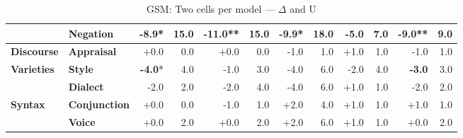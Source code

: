 \begin{table}[h]
{\begin{tabular}{llrrrrrrrrrr}
  & \textbf{Negation} & \cellcolor{red!17} \textbf{-8.9}* & \cellcolor{blue!12} 15.0 & \cellcolor{red!20} \textbf{-11.0}** & \cellcolor{blue!12} 15.0 & \cellcolor{red!19} \textbf{-9.9}* & \cellcolor{blue!14} 18.0 & \cellcolor{red!9} \textbf{-5.0} & \cellcolor{blue!5} 7.0 & \cellcolor{red!17} \textbf{-9.0}** & \cellcolor{blue!7} 9.0 \\
\midrule
\textbf{Discourse} & \textbf{Appraisal} & \cellcolor{red!0} +0.0 & \cellcolor{blue!0} 0.0 & \cellcolor{red!0} +0.0 & \cellcolor{blue!0} 0.0 & \cellcolor{red!1} -1.0 & \cellcolor{blue!0} 1.0 & \cellcolor{green!1} +1.0 & \cellcolor{blue!0} 1.0 & \cellcolor{red!1} -1.0 & \cellcolor{blue!0} 1.0 \\
\midrule
\textbf{Varieties} & \textbf{Style} & \cellcolor{red!7} \textbf{-4.0}* & \cellcolor{blue!3} 4.0 & \cellcolor{red!1} -1.0 & \cellcolor{blue!2} 3.0 & \cellcolor{red!7} -4.0 & \cellcolor{blue!4} 6.0 & \cellcolor{red!3} -2.0 & \cellcolor{blue!3} 4.0 & \cellcolor{red!5} \textbf{-3.0} & \cellcolor{blue!2} 3.0 \\
  & \textbf{Dialect} & \cellcolor{red!3} -2.0 & \cellcolor{blue!1} 2.0 & \cellcolor{red!3} -2.0 & \cellcolor{blue!3} 4.0 & \cellcolor{red!7} -4.0 & \cellcolor{blue!4} 6.0 & \cellcolor{green!1} +1.0 & \cellcolor{blue!0} 1.0 & \cellcolor{red!3} -2.0 & \cellcolor{blue!1} 2.0 \\
\midrule
\textbf{Syntax} & \textbf{Conjunction} & \cellcolor{red!0} +0.0 & \cellcolor{blue!0} 0.0 & \cellcolor{red!1} -1.0 & \cellcolor{blue!0} 1.0 & \cellcolor{green!3} +2.0 & \cellcolor{blue!3} 4.0 & \cellcolor{green!1} +1.0 & \cellcolor{blue!0} 1.0 & \cellcolor{green!1} +1.0 & \cellcolor{blue!0} 1.0 \\
  & \textbf{Voice} & \cellcolor{red!0} +0.0 & \cellcolor{blue!1} 2.0 & \cellcolor{red!0} +0.0 & \cellcolor{blue!1} 2.0 & \cellcolor{green!3} +2.0 & \cellcolor{blue!4} 6.0 & \cellcolor{green!1} +1.0 & \cellcolor{blue!0} 1.0 & \cellcolor{red!0} +0.0 & \cellcolor{blue!1} 2.0 \\
\bottomrule
\end{tabular}}
\caption{GSM: Two cells per model — $\Delta$ and U}\label{tab:gsm_combined_cells}
\end{table}